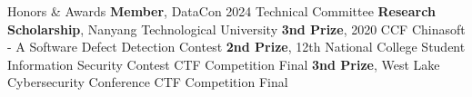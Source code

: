 \begin{rubric}{Honors \& Awards}
\entry*[2024] \textbf{Member}, DataCon 2024 Technical Committee
\entry*[2021] \textbf{Research Scholarship}, Nanyang Technological University
\entry*[2020] \textbf{3nd Prize}, 2020 CCF Chinasoft - A Software Defect Detection Contest
\entry*[2019] \textbf{2nd Prize}, 12th National College Student Information Security Contest CTF Competition Final
\entry*[2019] \textbf{3nd Prize}, West Lake Cybersecurity Conference CTF Competition Final
\end{rubric}